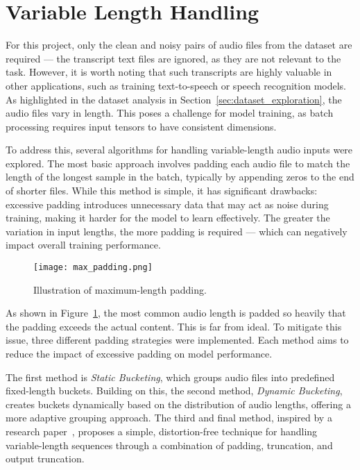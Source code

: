 \section{Variable Length Handling}
\label{sec:variable_length_handling}

For this project, only the clean and noisy pairs of audio files from the dataset are required — the transcript text files are ignored, as they are not relevant to the task. However, it is worth noting that such transcripts are highly valuable in other applications, such as training text-to-speech or speech recognition models. As highlighted in the dataset analysis in Section~\ref{sec:dataset_exploration}, the audio files vary in length. This poses a challenge for model training, as batch processing requires input tensors to have consistent dimensions.

To address this, several algorithms for handling variable-length audio inputs were explored. The most basic approach involves padding each audio file to match the length of the longest sample in the batch, typically by appending zeros to the end of shorter files. While this method is simple, it has significant drawbacks: excessive padding introduces unnecessary data that may act as noise during training, making it harder for the model to learn effectively. The greater the variation in input lengths, the more padding is required — which can negatively impact overall training performance.

\begin{figure}[h]
    \centering
    \texttt{[image: max\_padding.png]}
    \caption{\label{fig:max_padding}Illustration of maximum-length padding.}
\end{figure}

As shown in Figure~\ref{fig:max_padding}, the most common audio length is padded so heavily that the padding exceeds the actual content. This is far from ideal. To mitigate this issue, three different padding strategies were implemented. Each method aims to reduce the impact of excessive padding on model performance.

The first method is \textit{Static Bucketing}, which groups audio files into predefined fixed-length buckets. Building on this, the second method, \textit{Dynamic Bucketing}, creates buckets dynamically based on the distribution of audio lengths, offering a more adaptive grouping approach. The third and final method, inspired by a research paper~\cite{yoon2020pto}, proposes a simple, distortion-free technique for handling variable-length sequences through a combination of padding, truncation, and output truncation.

